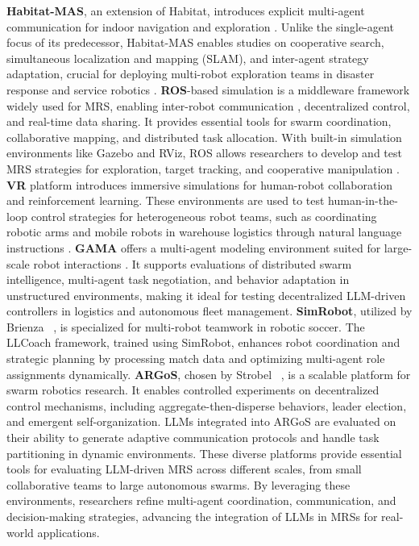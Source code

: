 \textbf{Habitat-MAS}, an extension of Habitat, introduces explicit multi-agent communication for indoor navigation and exploration \cite{habitat19iccv, szot2021habitat, puig2023habitat3}. Unlike the single-agent focus of its predecessor, Habitat-MAS enables studies on cooperative search, simultaneous localization and mapping (SLAM), and inter-agent strategy adaptation, crucial for deploying multi-robot exploration teams in disaster response and service robotics \cite{chen_emos_2024}.
\textbf{ROS}-based simulation is a middleware framework widely used for MRS, enabling inter-robot communication \cite{lampe2023robotkube}
, decentralized control, and real-time data sharing. It provides essential tools for swarm coordination, collaborative mapping, and distributed task allocation. With built-in simulation environments like Gazebo and RViz, ROS allows researchers to develop and test MRS strategies for exploration, target tracking, and cooperative manipulation \cite{wu_hierarchical_2024}.
\textbf{VR} platform introduces immersive simulations for human-robot collaboration and reinforcement learning. These environments are used to test human-in-the-loop control strategies for heterogeneous robot teams, such as coordinating robotic arms and mobile robots in warehouse logistics through natural language instructions \cite{lakhnati_exploring_2024}.
\textbf{GAMA} offers a multi-agent modeling environment suited for large-scale robot interactions \cite{gupte_rebel_2024}. It supports evaluations of distributed swarm intelligence, multi-agent task negotiation, and behavior adaptation in unstructured environments, making it ideal for testing decentralized LLM-driven controllers in logistics and autonomous fleet management.
\textbf{SimRobot}, utilized by Brienza \etal~\cite{brienza_llcoach_2024}, is specialized for multi-robot teamwork in robotic soccer. The LLCoach framework, trained using SimRobot, enhances robot coordination and strategic planning by processing match data and optimizing multi-agent role assignments dynamically.
\textbf{ARGoS}, chosen by Strobel \etal~\cite{strobel_llm2swarm_2024}, is a scalable platform for swarm robotics research. It enables controlled experiments on decentralized control mechanisms, including aggregate-then-disperse behaviors, leader election, and emergent self-organization. LLMs integrated into ARGoS are evaluated on their ability to generate adaptive communication protocols and handle task partitioning in dynamic environments.
These diverse platforms provide essential tools for evaluating LLM-driven MRS across different scales, from small collaborative teams to large autonomous swarms. By leveraging these environments, researchers refine multi-agent coordination, communication, and decision-making strategies, advancing the integration of LLMs in MRSs for real-world applications.

